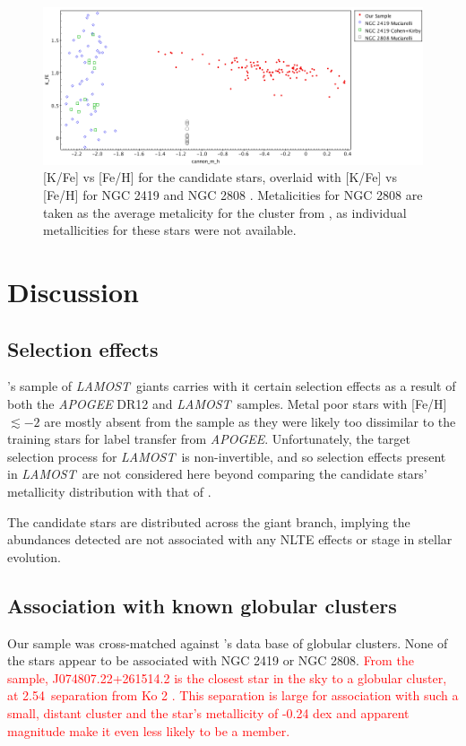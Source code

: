 \documentclass[a4paper,fleqn,usenatbib]{mnras}
\newcommand{\todo}[1]{\textcolor{red}{#1}}
\newcommand{\project}[1]{\emph{#1}}
\newcommand{\lamost}{\project{LAMOST}}
\begin{document}
\begin{figure}
	\includegraphics[width=\columnwidth]{KvsFe.png}
    \caption{[K/Fe] vs [Fe/H] for the candidate stars, overlaid with [K/Fe] vs [Fe/H] for NGC 2419 and NGC 2808 \citep{cohenkirby2012, mucciarelli2012, mucciarelli2015}. Metalicities for NGC 2808 are taken as the average metalicity for the cluster from \citet{harris1996}, as individual metallicities for these stars were not available.}
    \label{KvsFe}
\end{figure}

\section{Discussion}
\label{sec:discussion}

\subsection{Selection effects}
\label{sec:selectioneffects}
\cite{ho2017}'s sample of \lamost\ giants carries with it certain selection effects as a result of both the \textit{APOGEE} DR12 and \lamost\ samples. Metal poor stars with [Fe/H] $\lesssim-2$ are mostly absent from the sample as they were likely too dissimilar to the training stars for label transfer from \textit{APOGEE}. Unfortunately, the target selection process for \lamost\ is non-invertible, and so selection effects present in \lamost\ are not considered here beyond comparing the candidate stars' metallicity distribution with that of \cite{ho2017}.

The candidate stars are distributed across the giant branch, implying the abundances detected are not associated with any NLTE effects or stage in stellar evolution.

\subsection{Association with known globular clusters}
\label{sec:globclustasoc}
Our sample was cross-matched against \cite{harris1996}'s data base of globular clusters. None of the stars appear to be associated with NGC 2419 or NGC 2808. \todo{ From the sample, J074807.22+261514.2 is the closest star in the sky to a globular cluster, at 2.54\degree\ separation from Ko 2 \citep{koposov2007}. This separation is large for association with such a small, distant cluster and the star's metallicity of -0.24 dex and apparent magnitude make it even less likely to be a member.}
\end{document}
